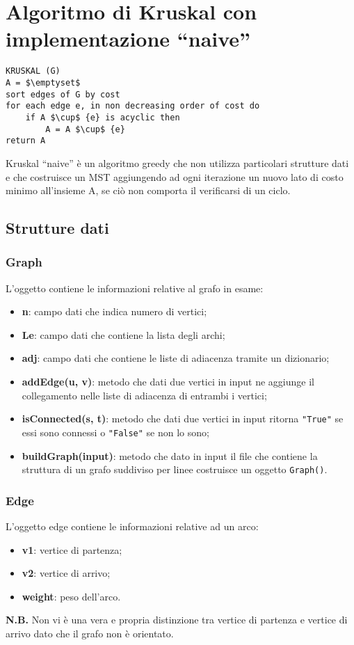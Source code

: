 \section{Algoritmo di Kruskal con implementazione ``naive''}\label{kruskal_naive}
\begin{lstlisting}[mathescape=true]
KRUSKAL (G)
A = $\emptyset$
sort edges of G by cost
for each edge e, in non decreasing order of cost do
	if A $\cup$ {e} is acyclic then
		A = A $\cup$ {e}
return A	
\end{lstlisting}
Kruskal ``naive'' è un algoritmo greedy che non utilizza particolari strutture dati e che costruisce un MST aggiungendo ad ogni iterazione un nuovo lato di costo minimo all'insieme A, se ciò non comporta il verificarsi di un ciclo.
\subsection{Strutture dati}
\subsubsection{Graph}\label{kruskal_naive_graph}
L'oggetto contiene le informazioni relative al grafo in esame:
\begin{itemize}
	\item \textbf{n}: campo dati che indica numero di vertici;
	\item \textbf{Le}: campo dati che contiene la lista degli archi;
	\item \textbf{adj}: campo dati che contiene le liste di adiacenza tramite un dizionario;
	\item \textbf{addEdge(u, v)}: metodo che dati due vertici in input ne aggiunge il collegamento nelle liste di adiacenza di entrambi i vertici;
	\item \textbf{isConnected(s, t)}: metodo che dati due vertici in input ritorna \texttt{"True"} se essi sono connessi o \texttt{"False"} se non lo sono;
	\item \textbf{buildGraph(input)}: metodo che dato in input il file che contiene la struttura di un grafo suddiviso per linee costruisce un oggetto \texttt{Graph()}.
\end{itemize} 
\subsubsection{Edge}\label{kruskal_naive_edge}
L'oggetto edge contiene le informazioni relative ad un arco:
\begin{itemize}
	\item \textbf{v1}: vertice di partenza;
	\item \textbf{v2}: vertice di arrivo;
	\item \textbf{weight}: peso dell'arco.
\end{itemize}
\textbf{N.B.} Non vi è una vera e propria distinzione tra vertice di partenza e vertice di arrivo dato che il grafo non è orientato.


